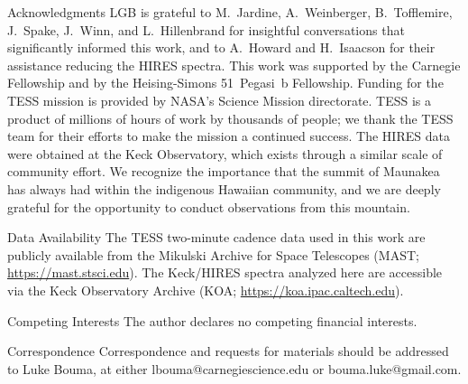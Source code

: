 \documentclass{nature3}
\begin{document}


   


\begin{addendum}

\item[Acknowledgments]
  LGB is grateful to M.~Jardine, A.~Weinberger, B.~Tofflemire,
  J.~Spake, J.~Winn, and L.~Hillenbrand for insightful conversations
  that significantly informed this work, and to A.~Howard and
  H.~Isaacson for their assistance reducing the HIRES spectra.
  This work was supported by the Carnegie Fellowship and by the
  Heising-Simons 51~Pegasi~b Fellowship.
  Funding for the TESS mission is provided by NASA’s Science Mission
  directorate.
  TESS is a product of millions of hours of work by thousands of people;
  we thank the TESS team for their efforts to make the mission a
  continued success.
  The HIRES data were obtained at the Keck Observatory, which exists
  through a similar scale of community effort.
  We recognize the importance that the summit of Maunakea has always had
  within the indigenous Hawaiian community, and we are deeply grateful 
  for the opportunity to conduct observations from this mountain.

%
\item[Data Availability] The TESS two-minute cadence data used in this
  work are publicly available from the Mikulski Archive for Space
  Telescopes (MAST; \url{https://mast.stsci.edu}). The Keck/HIRES
  spectra analyzed here are accessible via the Keck Observatory
  Archive (KOA; \url{https://koa.ipac.caltech.edu}).

\item[Competing Interests] The author declares no competing financial
  interests.
 
\item[Correspondence] Correspondence and requests for materials should
  be addressed to Luke Bouma, at either lbouma@carnegiescience.edu or
  bouma.luke@gmail.com.
\end{addendum}
\end{document}
